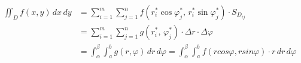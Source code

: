 \documentclass[preview]{standalone}
\begin{document}
\begin{align*}
\iint_D f(x, y) \,dx\,dy &= \sum_{i=1}^m \sum_{j=1}^n f\left(r_i^* \cos\varphi_j^*,\, r_i^* \sin\varphi_j^*\right)\cdot S_{D_{ij}} \\ &= \sum_{i=1}^m \sum_{j=1}^n g\left(r_i^*,\, \varphi_j^*\right)\cdot \Delta r \cdot \Delta \varphi \\ &= \int_{\alpha}^{\beta} \int_{a}^{b} g(r, \varphi)\, dr\, d\varphi = \int_{\alpha}^{\beta} \int_{a}^{b}  f(rcos\varphi, rsin\varphi) \cdot r\, dr\, d\varphi
\end{align*}
\end{document}
